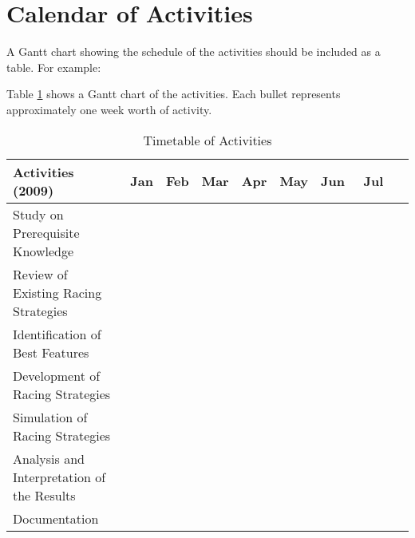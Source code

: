 \section{Calendar of Activities}

A Gantt chart showing the schedule of the activities should be included as a table. For example:

Table \ref{tab:timetableactivities} shows a Gantt chart of the activities.  Each bullet represents approximately
one week worth of activity.

%
%
\newcommand{\weekone}{\textbullet}
\newcommand{\weektwo}{\textbullet \textbullet}
\newcommand{\weekthree}{\textbullet \textbullet \textbullet}
\newcommand{\weekfour}{\textbullet \textbullet \textbullet \textbullet}

%
%
\begin{comment}
   \newcommand{\weekone}{$\star$}
   \newcommand{\weektwo}{$\star \star$}
   \newcommand{\weekthree}{$\star \star \star$}
   \newcommand{\weekfour}{$\star \star \star \star$ }
\end{comment}



\begin{table}[ht]   %
\centering
\caption{Timetable of Activities} \vspace{0.25em}
\begin{tabular}{|p{2in}|c|c|c|c|c|c|c|c|} \hline
\centering Activities (2009) & Jan   & Feb & Mar & Apr & May & Jun & Jul \\ \hline
Study on Prerequisite Knowledge      &   &  & ~~~\weektwo & \weekfour &  &  &  \\ \hline
Review of Existing Racing Strategies & ~~~\weektwo  & \weekfour & \weekfour & \weekfour &  &  &  \\ \hline
Identification of Best Features      &   &  &  & \weekfour & \weektwo~~~ &  &  \\ \hline
Development of Racing Strategies     &   &  &  & ~~~\weektwo & \weekfour & \weektwo~~~ &  \\ \hline
Simulation of Racing Strategies      &   &  &  & ~~~\weektwo & \weekfour & \weekthree~~ &  \\ \hline
Analysis and Interpretation of the Results &   &  &  &  & \weekfour & \weekfour & \weekone~~~~~ \\ \hline
Documentation & ~~~\weektwo  & \weekfour & \weekfour & \weekfour & \weekfour & \weekfour & \weektwo~~~ \\ \hline
\end{tabular}
\label{tab:timetableactivities}
\end{table}


